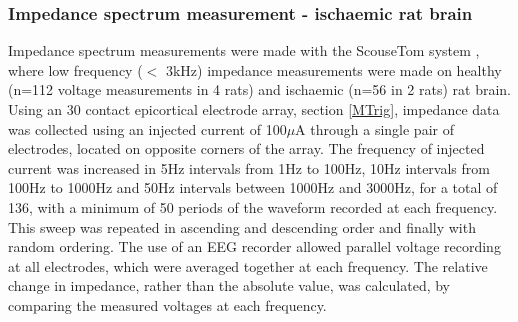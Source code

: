 \subsubsection{Impedance spectrum measurement - ischaemic rat brain}

Impedance spectrum measurements were made with the ScouseTom system \cite{Dowrick_2015}, where low frequency ($<$ 3kHz) impedance measurements were made on healthy (n=112 voltage measurements in 4 rats) and ischaemic (n=56 in 2 rats) rat brain. Using an 30 contact epicortical electrode array, section \ref{MTrig}, impedance data was collected using an injected current of 100$\mu$A through a single pair of electrodes, located on opposite corners of the array. The frequency of injected current was increased in 5Hz intervals from 1Hz to 100Hz, 10Hz intervals from 100Hz to 1000Hz and 50Hz intervals between 1000Hz and 3000Hz, for a total of 136, with a minimum of 50 periods of the waveform recorded at each frequency. This sweep was repeated in ascending and descending order and finally with random ordering. The use of an EEG recorder allowed parallel voltage recording at all electrodes, which were averaged together at each frequency. The relative change in impedance, rather than the absolute value, was calculated, by comparing the measured voltages at each frequency.